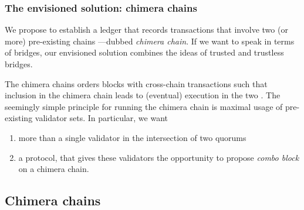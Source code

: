 \subsubsection{The envisioned solution: chimera chains}
\label{sec:envisioned-solution}
We propose to establish a ledger that records transactions
that involve two (or more) pre-existing chains%
---dubbed \emph{chimera chain}. 
If we want to speak in terms of bridges,
our envisioned solution combines the ideas of trusted and trustless bridges.

The chimera chains orders blocks with cross-chain transactions
such that inclusion in 
the chimera chain leads to (eventual) execution in the two \base[s]. 
The seemingly simple principle for running the chimera chain
is maximal usage of pre-existing validator sets.
In particular, we want
\begin{enumerate}
\item more than a single validator in the intersection of two quorums
\item a protocol, 
  that gives these validators the opportunity to propose \emph{combo block}
  on a chimera chain. 
\end{enumerate}


\subsection{Chimera chains}
\label{sec:chimera-chains}


